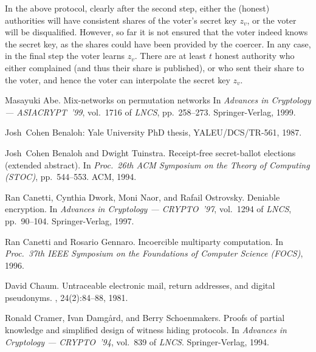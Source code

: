 \documentclass{article}
\begin{document}
\begin{appendix}
In the above protocol, clearly after the second step, either the (honest)
authorities will have consistent shares of the voter's secret key $z_v$, or
the voter will be disqualified. However, so far it is not ensured that the
voter indeed knows the secret key, as the shares could have been provided
by the coercer. In any case, in the final step the voter learns
$z_v$. There are at least $t$ honest authority who either complained 
(and thus their share is published), or who sent their share to the voter,
and hence the voter can interpolate the secret key $z_v$.

\end{appendix}


\begin{thebibliography}{[CDNO97]}

Masayuki Abe.
\newblock Mix-networks on permutation networks
\newblock In {\em Advances in Cryptology --- {ASIACRYPT}~'99},
  vol.~1716 of {\em LNCS}, pp.~258--273.
  {Springer-Verlag}, 1999.

Josh~Cohen Benaloh:
\newblock Yale University PhD thesis, YALEU/DCS/TR-561, 1987.

Josh~Cohen Benaloh and Dwight Tuinstra.
\newblock Receipt-free secret-ballot elections (extended abstract).
\newblock In {\em Proc.~26th {ACM} Symposium on the Theory of Computing
  ({STOC})}, pp.~544--553.
  ACM, 1994.

Ran Canetti, Cynthia Dwork, Moni Naor, and Rafail Ostrovsky.
\newblock Deniable encryption.
\newblock In {\em Advances in Cryptology --- {CRYPTO}~'97},
  vol.~1294 of {\em LNCS}, pp.~90--104.
  {Springer-Verlag}, 1997.

Ran Canetti and Rosario Gennaro.
\newblock Incoercible multiparty computation.
\newblock In {\em Proc.~37th {IEEE} Symposium on the Foundations of 
  Computer Science ({FOCS})}, 1996.

David Chaum.
\newblock Untraceable electronic mail, return addresses, and digital
  pseudonyms.
, 24(2):84--88, 1981.

Ronald Cramer, Ivan Damg{\aa}rd, and Berry Schoenmakers.
\newblock Proofs of partial knowledge and simplified design of witness 
  hiding protocols.
\newblock In {\em Advances in Cryptology --- {CRYPTO}~'94},
  vol.~839 of {\em LNCS}.
  {Springer-Verlag}, 1994.


\end{thebibliography}
\end{document}
